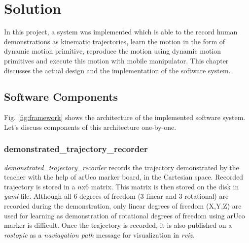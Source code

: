 
\chapter{Solution}


In this project, a system was implemented which is able to the record human demonstrations as kinematic trajectories, learn the motion in the form of dynamic motion primitive, reproduce the motion using dynamic motion primitives and execute this motion with mobile manipulator. This chapter discusses the actual design and the implementation of the software system. 

\section{Software Components}

Fig. \ref{fig:framework} shows the architecture of the implemented software system. Let's discuss components of this architecture one-by-one.  

\subsection{demonstrated\_trajectory\_recorder}


 
\textit{demonstrated\_trajectory\_recorder} records the trajectory demonstrated by the teacher with the help of arUco marker board, in the Cartesian space. Recorded trajectory is stored in a $n\text{x}6$ matrix. This matrix is then stored on the disk in \textit{yaml} file. Although all 6 degrees of freedom (3 linear and 3 rotational) are recorded during the demonstration, only linear degrees of freedom (X,Y,Z) are used for learning as demonstration of rotational degrees of freedom using arUco marker is difficult. Once the trajectory is recorded, it is also published on a \textit{rostopic} as a \textit{naviagation path} message for visualization in \textit{rviz}. 

